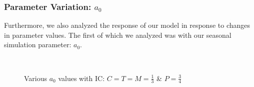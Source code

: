 \documentclass[12pt]{article}
\begin{document}
\subsubsection{Parameter Variation: $a_{0}$}
Furthermore, we also analyzed the response of our model in response to changes in parameter values. The first of which we analyzed was with our seasonal simulation parameter: $a_{0}$.\\
\begin{figure}[H]%
    \centering
    \quad
    \\
    \quad
    \caption{Various $a_{0}$ values with IC: $C=T=M=\frac{1}{3}$ \& $P = \frac{3}{4}$}%
    \label{fig:a_graphs}%
\end{figure}
\end{document}
